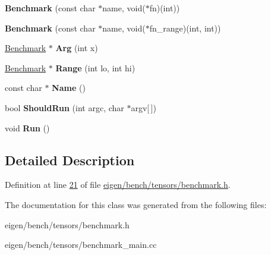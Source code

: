 \begin{DoxyCompactItemize}
{\bfseries Benchmark} (const char $\ast$name, void($\ast$fn)(int))
\item 
\mbox{\label{classtesting_1_1_benchmark_ade815a2836cacda5dcb65c14691c1ead}} 
{\bfseries Benchmark} (const char $\ast$name, void($\ast$fn\+\_\+range)(int, int))
\item 
\mbox{\label{classtesting_1_1_benchmark_a548ad3652ed7c8b9169a9a3a4e09259e}} 
\hyperlink{classtesting_1_1_benchmark}{Benchmark} $\ast$ {\bfseries Arg} (int x)
\item 
\mbox{\label{classtesting_1_1_benchmark_abf3ded373217013059462e9caf7ccc78}} 
\hyperlink{classtesting_1_1_benchmark}{Benchmark} $\ast$ {\bfseries Range} (int lo, int hi)
\item 
\mbox{\label{classtesting_1_1_benchmark_ad4c77e64b930e04d92b706218917d303}} 
const char $\ast$ {\bfseries Name} ()
\item 
\mbox{\label{classtesting_1_1_benchmark_a2a9a4922fdcd9fd8291db3c0958b6bb0}} 
bool {\bfseries Should\+Run} (int argc, char $\ast$argv\mbox{[}$\,$\mbox{]})
\item 
\mbox{\label{classtesting_1_1_benchmark_aba2258980adf0c0e95835d8644168bdc}} 
void {\bfseries Run} ()
\end{DoxyCompactItemize}


\subsection{Detailed Description}


Definition at line \hyperlink{eigen_2bench_2tensors_2benchmark_8h_source_l00021}{21} of file \hyperlink{eigen_2bench_2tensors_2benchmark_8h_source}{eigen/bench/tensors/benchmark.\+h}.



The documentation for this class was generated from the following files\+:\begin{DoxyCompactItemize}
\item 
eigen/bench/tensors/benchmark.\+h\item 
eigen/bench/tensors/benchmark\+\_\+main.\+cc\end{DoxyCompactItemize}
